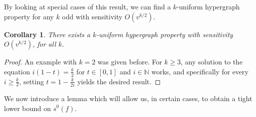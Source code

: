 \documentclass[psamsfonts]{amsart}
\newtheorem{cor}[theorem]{Corollary}
\theoremstyle{definition}
\theoremstyle{remark}
\numberwithin{equation}{section}
\begin{document}
	By looking at special cases of this result, we can find a $k$-uniform hypergraph property for any $k$ odd with sensitivity $O(v^{k/2})$.
	\begin{cor}
		There exists a $k$-uniform hypergraph property with sensitivity $O(v^{k/2})$, for all $k$.
	\end{cor}
	\begin{proof}
		An example with $k=2$ was given before. For $k\geq 3$, any solution to the equation $i(1-t)=\frac{k}{2}$ for $t\in[0,1]$ and $i\in\mathbb{N}$ works, and specifically for every $i\geq\frac{k}{2}$, setting $t=1-\frac{k}{2i}$ yields the desired result.
	\end{proof}

	We now introduce a lemma which will allow us, in certain cases, to obtain a tight lower bound on $s^0(f)$.
\end{document}
